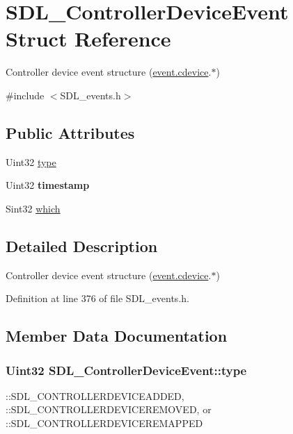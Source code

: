 \hypertarget{structSDL__ControllerDeviceEvent}{\section{S\+D\+L\+\_\+\+Controller\+Device\+Event Struct Reference}
\label{structSDL__ControllerDeviceEvent}
}


Controller device event structure (\hyperlink{unionSDL__Event_ad3beed01e690b885728e0b0e1d636378}{event.\+cdevice}.$\ast$)  




{\ttfamily \#include $<$S\+D\+L\+\_\+events.\+h$>$}

\subsection*{Public Attributes}
\begin{DoxyCompactItemize}
\item 
Uint32 \hyperlink{structSDL__ControllerDeviceEvent_a45b3807eaf70a5f5cf712455da277536}{type}
\item 
\hypertarget{structSDL__ControllerDeviceEvent_a62945795fc17f5000fddc80e2cf921b8}{Uint32 {\bfseries timestamp}}\label{structSDL__ControllerDeviceEvent_a62945795fc17f5000fddc80e2cf921b8}

\item 
Sint32 \hyperlink{structSDL__ControllerDeviceEvent_accb80de1619c1e790cffb6c888c915db}{which}
\end{DoxyCompactItemize}


\subsection{Detailed Description}
Controller device event structure (\hyperlink{unionSDL__Event_ad3beed01e690b885728e0b0e1d636378}{event.\+cdevice}.$\ast$) 

Definition at line 376 of file S\+D\+L\+\_\+events.\+h.



\subsection{Member Data Documentation}
\hypertarget{structSDL__ControllerDeviceEvent_a45b3807eaf70a5f5cf712455da277536}{
\subsubsection[{type}]{\setlength{\rightskip}{0pt plus 5cm}Uint32 S\+D\+L\+\_\+\+Controller\+Device\+Event\+::type}}\label{structSDL__ControllerDeviceEvent_a45b3807eaf70a5f5cf712455da277536}
\+::\+S\+D\+L\+\_\+\+C\+O\+N\+T\+R\+O\+L\+L\+E\+R\+D\+E\+V\+I\+C\+E\+A\+D\+D\+E\+D, \+::\+S\+D\+L\+\_\+\+C\+O\+N\+T\+R\+O\+L\+L\+E\+R\+D\+E\+V\+I\+C\+E\+R\+E\+M\+O\+V\+E\+D, or \+::\+S\+D\+L\+\_\+\+C\+O\+N\+T\+R\+O\+L\+L\+E\+R\+D\+E\+V\+I\+C\+E\+R\+E\+M\+A\+P\+P\+E\+D 

